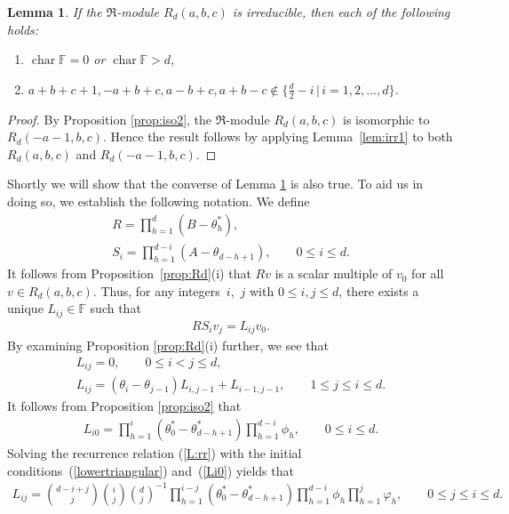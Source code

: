 \documentclass[pdftex]{sigma}
\def\F{\mathbb F}
\numberwithin{equation}{section}
\newtheorem{Lemma}[Theorem]{Lemma}
\begin{document}
\begin{Lemma}\label{lem:irr2}If the $\Re$-module $R_d(a,b,c)$ is irreducible, then each of the following holds:
\begin{enumerate}\itemsep=0pt
\item[{\rm (i)}] $\operatorname{char} \F=0$ or $\operatorname{char} \F>d$,

\item[{\rm (ii)}] $a+b+c+1, -a+b+c, a-b+c, a+b-c\not\in \big\{ \frac{d}{2}-i \,\big|\,i=1,2,\ldots,d \big\}$.
\end{enumerate}
\end{Lemma}
\begin{proof}
By Proposition \ref{prop:iso2}, the $\Re$-module $R_d(a,b,c)$ is isomorphic to $R_d(-a-1,b,c)$. Hence the result follows by applying Lemma~\ref{lem:irr1} to both $R_d(a,b,c)$ and $R_d(-a-1,b,c)$.
\end{proof}






Shortly we will show that the converse of Lemma \ref{lem:irr2} is also true.
To aid us in doing so, we establish the following notation.
We define
\begin{gather*}
R=\prod_{h=1}^{d} (B-\theta^*_h ),\\
S_i=\prod_{h=1}^{d-i}(A-\theta_{d-h+1} ), \qquad 0\leq i\leq d.
\end{gather*}
It follows from Proposition~\ref{prop:Rd}(i) that $Rv$ is a scalar multiple of $v_0$ for all $v\in R_d(a,b,c)$. Thus, for any integers~$i$,~$j$ with $0\leq i,j\leq d$, there exists a unique $L_{ij}\in \F$ such that
\begin{gather}\label{defn:Lij}
RS_i v_j=L_{ij} v_0.
\end{gather}
By examining Proposition \ref{prop:Rd}(i) further, we see that
\begin{gather}
L_{ij}=0,\qquad 0\leq i<j\leq d,\label{lowertriangular}\\
L_{ij}=(\theta_{i}-\theta_{j-1}) L_{i,j-1}+L_{i-1,j-1}, \qquad 1\leq j\leq i \leq d.\label{L:rr}
\end{gather}
It follows from Proposition \ref{prop:iso2} that
\begin{gather}\label{Li0}
L_{i0}=\prod_{h=1}^{i} (\theta_0^*-\theta_{d-h+1}^*) \prod_{h=1}^{d-i} \phi_h, \qquad 0\leq i\leq d.
\end{gather}
Solving the recurrence relation (\ref{L:rr}) with the initial conditions~(\ref{lowertriangular}) and~(\ref{Li0}) yields that
\begin{gather}\label{Lij}
L_{ij}={d-i+j \choose j}{i \choose j}{d \choose j}^{-1}
\prod_{h=1}^{i-j} (\theta_0^*-\theta_{d-h+1}^*)
\prod_{h=1}^{d-i} \phi_h \prod_{h=1}^j \varphi_h, \qquad 0\leq j\leq i\leq d.
\end{gather}
\end{document}
